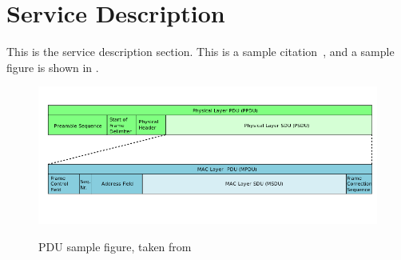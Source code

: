 \section{Service Description}
\label{sec:serv_desc}

This is the service description section. This is a sample citation~\cite{pdu_wiki}, and a sample figure is shown in .

\begin{figure}[h]
  \centering
  \label{fig:serv_desc:pdu}
  \includegraphics[width=5in]{figures/pdu_sample_figure.png}\\
  \caption{PDU sample figure, taken from~\cite{pdu_wiki}}
\end{figure}

